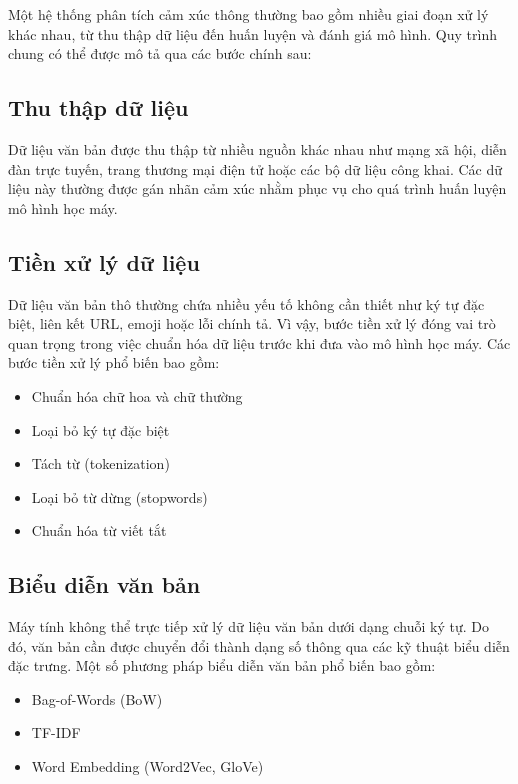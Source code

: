 \documentclass[14pt, a4paper]{report}
\begin{document}
Một hệ thống phân tích cảm xúc thông thường bao gồm nhiều giai đoạn xử lý khác nhau, từ thu thập dữ liệu đến huấn luyện và đánh giá mô hình. Quy trình chung có thể được mô tả qua các bước chính sau:

\subsection{Thu thập dữ liệu}

Dữ liệu văn bản được thu thập từ nhiều nguồn khác nhau như mạng xã hội, diễn đàn trực tuyến, trang thương mại điện tử hoặc các bộ dữ liệu công khai. Các dữ liệu này thường được gán nhãn cảm xúc nhằm phục vụ cho quá trình huấn luyện mô hình học máy.

\subsection{Tiền xử lý dữ liệu}

Dữ liệu văn bản thô thường chứa nhiều yếu tố không cần thiết như ký tự đặc biệt, liên kết URL, emoji hoặc lỗi chính tả. Vì vậy, bước tiền xử lý đóng vai trò quan trọng trong việc chuẩn hóa dữ liệu trước khi đưa vào mô hình học máy. Các bước tiền xử lý phổ biến bao gồm:

\begin{itemize}
    \item Chuẩn hóa chữ hoa và chữ thường
    \item Loại bỏ ký tự đặc biệt
    \item Tách từ (tokenization)
    \item Loại bỏ từ dừng (stopwords)
    \item Chuẩn hóa từ viết tắt
\end{itemize}

\subsection{Biểu diễn văn bản}

Máy tính không thể trực tiếp xử lý dữ liệu văn bản dưới dạng chuỗi ký tự. Do đó, văn bản cần được chuyển đổi thành dạng số thông qua các kỹ thuật biểu diễn đặc trưng. Một số phương pháp biểu diễn văn bản phổ biến bao gồm:

\begin{itemize}
    \item Bag-of-Words (BoW)
    \item TF-IDF
    \item Word Embedding (Word2Vec, GloVe)
\end{itemize}
\end{document}

